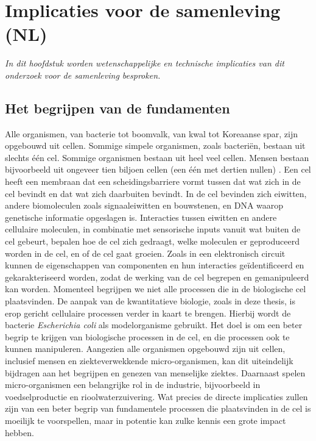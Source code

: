 
\chapter*{Implicaties voor de samenleving (NL)}


\textit{In dit hoofdstuk worden wetenschappelijke en technische implicaties van dit onderzoek voor de samenleving besproken.}

\section*{Het begrijpen van de fundamenten}

Alle organismen, van bacterie tot boomvalk, van kwal tot Koreaanse spar, zijn opgebouwd uit cellen.
%
Sommige simpele organismen, zoals bacteriën, bestaan uit slechts één cel.
Sommige organismen bestaan uit heel veel cellen.
Mensen bestaan bijvoorbeeld uit ongeveer tien biljoen cellen (een één met dertien nullen) \cite[BNID 102390]{Milo2010}.
%
Een cel heeft een membraan dat 
een scheidingsbarriere vormt tussen dat wat zich in de cel bevindt en dat wat zich daarbuiten bevindt. 
In de cel bevinden zich eiwitten, andere biomoleculen zoals signaaleiwitten en bouwstenen, en DNA waarop genetische informatie opgeslagen is.
%
Interacties tussen eiwitten en andere cellulaire moleculen, in combinatie met sensorische inputs vanuit wat buiten de cel gebeurt,
bepalen hoe de cel zich gedraagt, welke moleculen er geproduceerd worden in de cel, en of de cel gaat groeien.
%
Zoals in een elektronisch circuit kunnen de eigenschappen van componenten en hun interacties 
geïdentificeerd en gekarakteriseerd worden,
zodat de werking van de cel begrepen en gemanipuleerd kan worden.
%
Momenteel begrijpen we niet alle processen die in de biologische cel plaatsvinden.
%
De aanpak van de kwantitatieve biologie, zoals in deze thesis,
is erop gericht cellulaire processen verder in kaart te brengen.
Hierbij wordt de bacterie \textit{Escherichia coli} als modelorganisme gebruikt.
%
Het doel is om een beter begrip te krijgen van biologische processen in de cel, 
en die processen ook te kunnen manipuleren.
%
Aangezien alle organismen opgebouwd zijn uit cellen,
inclusief mensen en ziekteverwekkende micro-organismen, 
kan dit uiteindelijk bijdragen aan het begrijpen en genezen van menselijke ziektes.
%
Daarnaast spelen micro-organismen een belangrijke rol in de industrie,
bijvoorbeeld in voedselproductie en rioolwaterzuivering.
%
Wat precies de directe implicaties zullen zijn van een beter begrip van fundamentele processen die plaatsvinden in de cel is moeilijk te voorspellen,
maar in potentie kan zulke kennis een grote impact hebben. 

